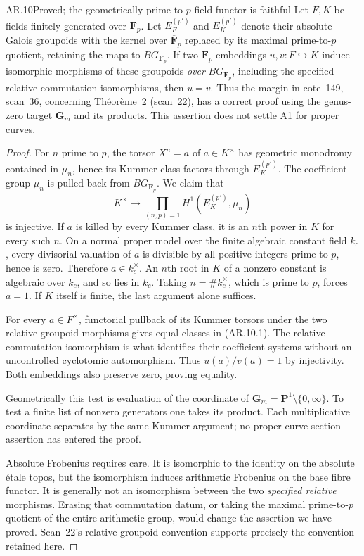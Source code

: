 \begin{claim}{AR.10}{Proved; the geometrically prime-to-$p$ field functor is faithful}
Let $F,K$ be fields finitely generated over $\mathbf F_p$.  Let
$E_F^{(p')}$ and $E_K^{(p')}$ denote their absolute Galois groupoids
with the kernel over $\overline{\mathbf F}_p$ replaced by its maximal
prime-to-$p$ quotient, retaining the maps to $BG_{\mathbf F_p}$.
If two $\mathbf F_p$-embeddings $u,v:F\hookrightarrow K$ induce
isomorphic morphisms of these groupoids \emph{over}
$BG_{\mathbf F_p}$, including the specified relative commutation
isomorphisms, then $u=v$.
Thus the margin in cote~149, scan~36, concerning Th\'eor\`eme~2
(scan~22), has a correct proof using the genus-zero target
$\mathbf G_m$ and its products.  This assertion does not settle A1
for proper curves.
\end{claim}
\begin{proof}
For $n$ prime to $p$, the torsor $X^n=a$ of $a\in K^\times$ has
geometric monodromy contained in $\mu_n$, hence its Kummer class
factors through $E_K^{(p')}$.  The coefficient group $\mu_n$ is
pulled back from $BG_{\mathbf F_p}$.  We claim that
\[
 K^\times\longrightarrow
       \prod_{(n,p)=1}H^1(E_K^{(p')},\mu_n)
                                                        \tag{AR.10.1}
\]
is injective.  If $a$ is killed by every Kummer class, it is an
$n$th power in $K$ for every such $n$.  On a normal proper model
over the finite algebraic constant field $k_c$, every divisorial
valuation of $a$ is divisible by all positive integers prime to
$p$, hence is zero.  Therefore $a\in k_c^\times$.  An $n$th root
in $K$ of a nonzero constant is algebraic over $k_c$, and so lies
in $k_c$.  Taking $n=\#k_c^\times$, which is prime to $p$, forces
$a=1$.  If $K$ itself is finite, the last argument alone suffices.

For every $a\in F^\times$, functorial pullback of its Kummer
torsors under the two relative groupoid morphisms gives equal
classes in (AR.10.1).  The relative commutation isomorphism is what
identifies their coefficient systems without an uncontrolled
cyclotomic automorphism.  Thus $u(a)/v(a)=1$ by injectivity.
Both embeddings also preserve zero, proving equality.

Geometrically this test is evaluation of the coordinate of
$\mathbf G_m=\mathbf P^1\setminus\{0,\infty\}$.  To test a finite
list of nonzero generators one takes its product.  Each multiplicative
coordinate separates by the same Kummer argument; no proper-curve
section assertion has entered the proof.

Absolute Frobenius requires care.  It is isomorphic to the identity
on the absolute \'etale topos, but the isomorphism induces arithmetic
Frobenius on the base fibre functor.  It is generally not an
isomorphism between the two \emph{specified relative} morphisms.
Erasing that commutation datum, or taking the maximal prime-to-$p$
quotient of the entire arithmetic group, would change the assertion
we have proved.  Scan~22's relative-groupoid convention supports
precisely the convention retained here.
\end{proof}

